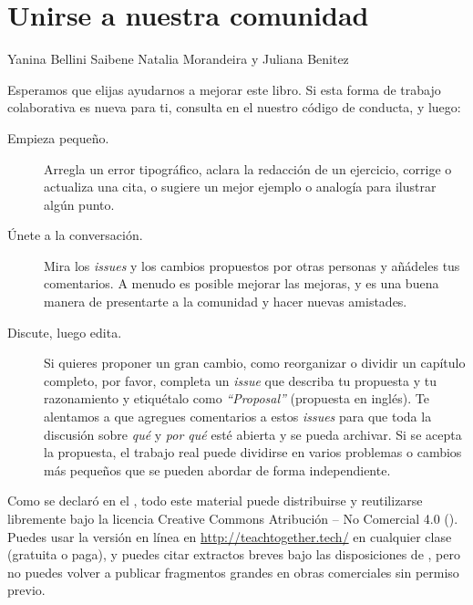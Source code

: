\chapter{Unirse a nuestra comunidad}\label{s:joining}

\begin{reviewer}
{Yanina Bellini Saibene}
{Natalia Morandeira y Juliana Benitez}
\end{reviewer}

Esperamos que elijas ayudarnos a mejorar este libro.
Si esta forma de trabajo colaborativa es nueva para ti,
consulta en el  nuestro código de conducta,
y luego:

\begin{description}

\item[Empieza pequeño.]
  Arregla un error tipográfico,
  aclara la redacción de un ejercicio,
  corrige o actualiza una cita,
  o sugiere un mejor ejemplo o analogía para ilustrar algún punto.

\item[Únete a la conversación.]
  Mira los \emph{issues} y los cambios propuestos por otras personas
  y añádeles tus comentarios.
  A menudo es posible mejorar las mejoras,
  y es una buena manera de presentarte a la comunidad y hacer nuevas amistades.

\item[Discute, luego edita.]
  Si quieres proponer un gran cambio,
  como reorganizar o dividir un capítulo completo,
  por favor, completa un \emph{issue} que describa tu propuesta y tu razonamiento y etiquétalo como  \emph{``Proposal''} (propuesta en inglés).
  Te alentamos a que agregues comentarios a estos \emph{issues}
  para que toda la discusión sobre \emph{qué} y \emph{por qué} esté abierta y se pueda archivar.
  Si se acepta la propuesta,
  el trabajo real puede dividirse en varios problemas o cambios más pequeños
  que se pueden abordar de forma independiente.
\end{description}


Como se declaró en el ,
todo este material puede distribuirse y reutilizarse libremente
bajo la licencia Creative Commons Atribución -- No Comercial 4.0
().
Puedes usar la versión en línea en \url{http://teachtogether.tech/} en cualquier clase (gratuita o paga),
y puedes citar extractos breves bajo las disposiciones de ,
pero no puedes volver a publicar fragmentos grandes en obras comerciales sin permiso previo.

